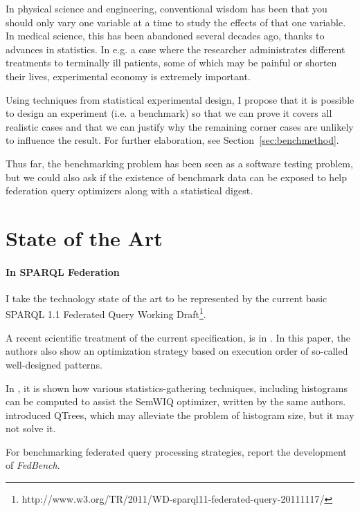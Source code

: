 \documentclass{llncs}
\begin{document}
In physical science and engineering, conventional wisdom has been that
you should only vary one variable at a time to study the effects of
that one variable. In medical science, this has been abandoned several
decades ago, thanks to advances in statistics. In e.g. a case where
the researcher administrates different treatments to terminally ill
patients, some of which may be painful or shorten their lives,
experimental economy is extremely important.

Using techniques from statistical experimental design, I propose
that it is possible to design an experiment (i.e. a benchmark) so that
we can prove it covers all realistic cases and that we can justify
why the remaining corner cases are unlikely to influence the
result. For further elaboration, see Section~\ref{sec:benchmethod}.

Thus far, the benchmarking problem has been seen as a software testing
problem, but we could also ask if the existence of benchmark data can
be exposed to help federation query optimizers along with a
statistical digest.

\section{State of the Art}

\paragraph{In SPARQL Federation}

I take the technology state of the art to be represented by the
current basic SPARQL 1.1 Federated Query Working
Draft\footnote{http://www.w3.org/TR/2011/WD-sparql11-federated-query-20111117/}. 

A recent scientific treatment of the current specification, is in
\cite{springerlink:10.1007/978-3-642-21064-8-1}. In this paper, the
authors also show an optimization strategy based on execution order of
so-called well-designed patterns.

In \cite{5337556}, it is shown how various statistics-gathering
techniques, including histograms can be computed to assist the SemWIQ
optimizer, written by the same authors.
\cite{Harth:2010:DSO:1772690.1772733} introduced QTrees, which may
alleviate the problem of histogram size, but it may not solve it.

For benchmarking federated query processing strategies,
\cite{Schmidt:2011:FBS:2063016.2063054} report the development of \emph{FedBench}.
\end{document}

